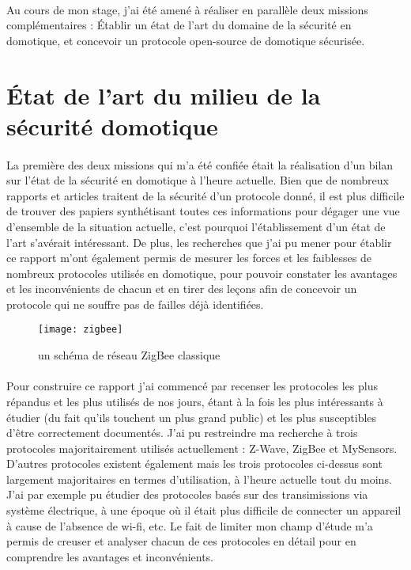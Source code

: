 \documentclass[12 pt]{report}
\begin{document}
\paragraph{}Au cours de mon stage, j'ai été amené à réaliser en parallèle deux missions complémentaires : Établir un état de l'art du domaine de la sécurité en domotique, et concevoir un protocole open-source de domotique sécurisée.
\section{État de l'art du milieu de la sécurité domotique}
\paragraph{}La première des deux missions qui m'a été confiée était la réalisation d'un bilan sur l'état de la sécurité en domotique à l'heure actuelle. Bien que de nombreux rapports et articles traitent de la sécurité d'un protocole donné, il est plus difficile de trouver des papiers synthétisant toutes ces informations pour dégager une vue d'ensemble de la situation actuelle, c'est pourquoi l'établissement d'un état de l'art s'avérait intéressant. De plus, les recherches que j'ai pu mener pour établir ce rapport m'ont également permis de mesurer les forces et les faiblesses de nombreux protocoles utilisés en domotique, pour pouvoir constater les avantages et les inconvénients de chacun et en tirer des leçons afin de concevoir un protocole qui ne souffre pas de failles déjà identifiées.


\begin{figure}
\center
\texttt{[image: zigbee]}
\caption{un schéma de réseau ZigBee classique}
\end{figure}
\paragraph{}Pour construire ce rapport j'ai commencé par recenser les protocoles les plus répandus et les plus utilisés de nos jours, étant à la fois les plus intéressants à étudier (du fait qu'ils touchent un plus grand public) et les plus susceptibles d'être correctement documentés. J'ai pu restreindre ma recherche à trois protocoles majoritairement utilisés actuellement : Z-Wave, ZigBee et MySensors. D'autres protocoles existent également mais les trois protocoles ci-dessus sont largement majoritaires en termes d'utilisation, à l'heure actuelle tout du moins. J'ai par exemple pu étudier des protocoles basés sur des transimissions via système électrique, à une époque où il était plus difficile de connecter un appareil à cause de l'absence de wi-fi, etc. Le fait de limiter mon champ d'étude m'a permis de creuser et analyser chacun de ces protocoles en détail pour en comprendre les avantages et inconvénients.
\end{document}
